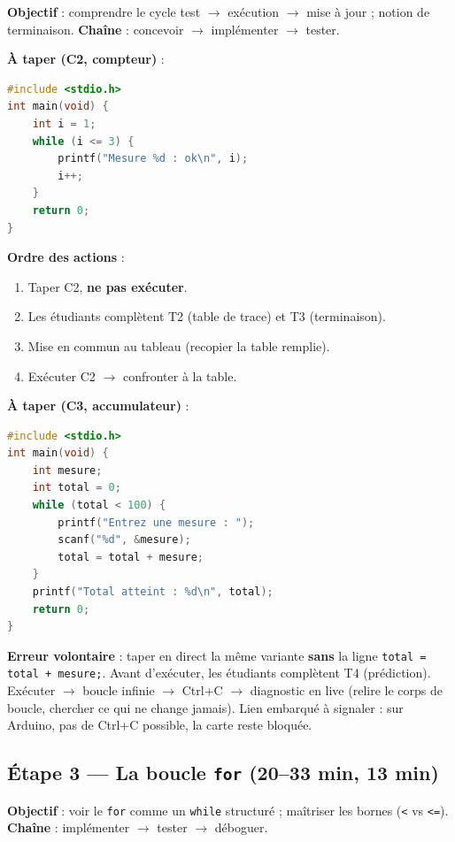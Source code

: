 \documentclass[cours, noCustomPackages]{UPSTI_Document}
\begin{document}
\textbf{Objectif} : comprendre le cycle test $\to$ exécution $\to$ mise à
jour ; notion de terminaison. \textbf{Chaîne} : concevoir $\to$ implémenter
$\to$ tester.

\textbf{À taper (C2, compteur)} :
\begin{lstlisting}[language=c]
#include <stdio.h>
int main(void) {
    int i = 1;
    while (i <= 3) {
        printf("Mesure %d : ok\n", i);
        i++;
    }
    return 0;
}
\end{lstlisting}

\textbf{Ordre des actions} :
\begin{enumerate}
	\item Taper C2, \textbf{ne pas exécuter}.
	\item Les étudiants complètent T2 (table de trace) et T3 (terminaison).
	\item Mise en commun au tableau (recopier la table remplie).
	\item Exécuter C2 $\to$ confronter à la table.
\end{enumerate}

\TableTraceCDeux
\TrouDeuxCorrection

\TrouTrois

\textbf{À taper (C3, accumulateur)} :
\begin{lstlisting}[language=c]
#include <stdio.h>
int main(void) {
    int mesure;
    int total = 0;
    while (total < 100) {
        printf("Entrez une mesure : ");
        scanf("%d", &mesure);
        total = total + mesure;
    }
    printf("Total atteint : %d\n", total);
    return 0;
}
\end{lstlisting}

\textbf{Erreur volontaire} : taper en direct la même variante \textbf{sans}
la ligne \texttt{total = total + mesure;}. Avant d'exécuter, les étudiants
complètent T4 (prédiction). Exécuter $\to$ boucle infinie $\to$ Ctrl+C $\to$
diagnostic en live (relire le corps de boucle, chercher ce qui ne change
jamais). Lien embarqué à signaler : sur Arduino, pas de Ctrl+C possible, la
carte reste bloquée.

\TrouQuatre

\subsection*{Étape 3 --- La boucle \texttt{for} (20--33 min, 13 min)}

\textbf{Objectif} : voir le \texttt{for} comme un \texttt{while} structuré ;
maîtriser les bornes (\texttt{<} vs \texttt{<=}). \textbf{Chaîne} :
implémenter $\to$ tester $\to$ déboguer.
\end{document}
